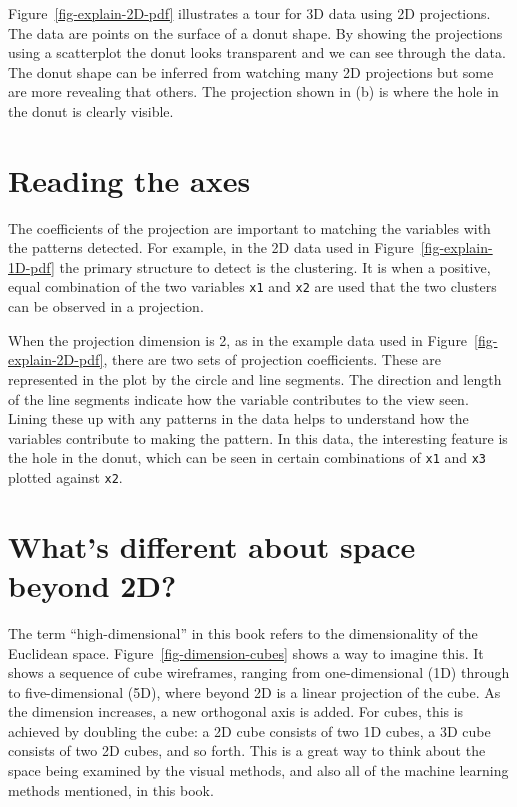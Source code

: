 \documentclass[
  letterpaper,
]{krantz}
\begin{document}
Figure~\ref{fig-explain-2D-pdf} illustrates a tour for 3D data using 2D
projections. The data are points on the surface of a donut shape. By
showing the projections using a scatterplot the donut looks transparent
and we can see through the data. The donut shape can be inferred from
watching many 2D projections but some are more revealing that others.
The projection shown in (b) is where the hole in the donut is clearly
visible. 

\section{Reading the axes}\label{reading-the-axes}

The coefficients of the projection are important to matching the
variables with the patterns detected. For example, in the 2D data used
in Figure~\ref{fig-explain-1D-pdf} the primary structure to detect is
the clustering. It is when a positive, equal combination of the two
variables \texttt{x1} and \texttt{x2} are used that the two clusters can
be observed in a projection.

When the projection dimension is 2, as in the example data used in
Figure~\ref{fig-explain-2D-pdf}, there are two sets of projection
coefficients. These are represented in the plot by the circle and line
segments. The direction and length of the line segments indicate how the
variable contributes to the view seen. Lining these up with any patterns
in the data helps to understand how the variables contribute to making
the pattern. In this data, the interesting feature is the hole in the
donut, which can be seen in certain combinations of \texttt{x1} and
\texttt{x3} plotted against \texttt{x2}.

\section{What's different about space beyond
2D?}\label{whats-different-about-space-beyond-2d}

The term ``high-dimensional'' in this book refers to the dimensionality
of the Euclidean space. Figure~\ref{fig-dimension-cubes} shows a way to
imagine this. It shows a sequence of cube wireframes, ranging from
one-dimensional (1D) through to five-dimensional (5D), where beyond 2D
is a linear projection of the cube. As the dimension increases, a new
orthogonal axis is added. For cubes, this is achieved by doubling the
cube: a 2D cube consists of two 1D cubes, a 3D cube consists of two 2D
cubes, and so forth. This is a great way to think about the space being
examined by the visual methods, and also all of the machine learning
methods mentioned, in this book.
\end{document}
